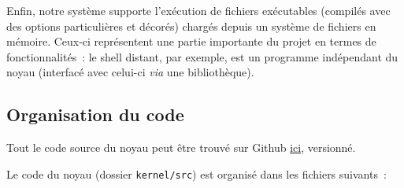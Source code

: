 \documentclass[11pt,a4paper]{article}
\newcommand{\fname}[1]{\texttt{#1}} %
\begin{document}
Enfin, notre système supporte l'exécution de fichiers exécutables
(compilés avec des options particulières et décorés) chargés depuis un
système de fichiers en mémoire. Ceux-ci représentent une partie importante
du projet en termes de fonctionnalités~: le shell distant, par exemple, est
un programme indépendant du noyau (interfacé avec celui-ci \textit{via} une
bibliothèque).

\subsection{Organisation du code}

Tout le code source du noyau peut être trouvé sur Github
\href{https://github.com/tobast/sysres-pikern}{ici}, versionné.

Le code du noyau (dossier \fname{kernel/src}) est organisé dans les fichiers
suivants~:
\end{document}
